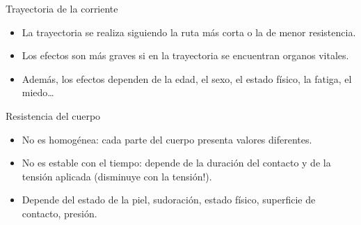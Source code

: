 \documentclass[xcolor={usenames,svgnames,dvipsnames}]{beamer}
\begin{document}
\begin{frame}[label=sec-2-1-3]{Trayectoria de la corriente}
\begin{itemize}
\item La trayectoria se realiza siguiendo la ruta más corta o la de menor
resistencia.

\item Los efectos son más graves si en la trayectoria se encuentran organos
vitales.

\item Además, los efectos dependen de la edad, el sexo, el estado físico,
la fatiga, el miedo\ldots{}
\end{itemize}
\end{frame}

\begin{frame}[label=sec-2-1-4]{Resistencia del cuerpo}
\begin{itemize}
\item No es homogénea: cada parte del cuerpo presenta valores diferentes.

\item No es estable con el tiempo: depende de la duración del contacto y de
la tensión aplicada (disminuye con la tensión!).

\item Depende del estado de la piel, sudoración, estado físico, superficie
de contacto, presión.
\end{itemize}
\end{frame}
\end{document}
